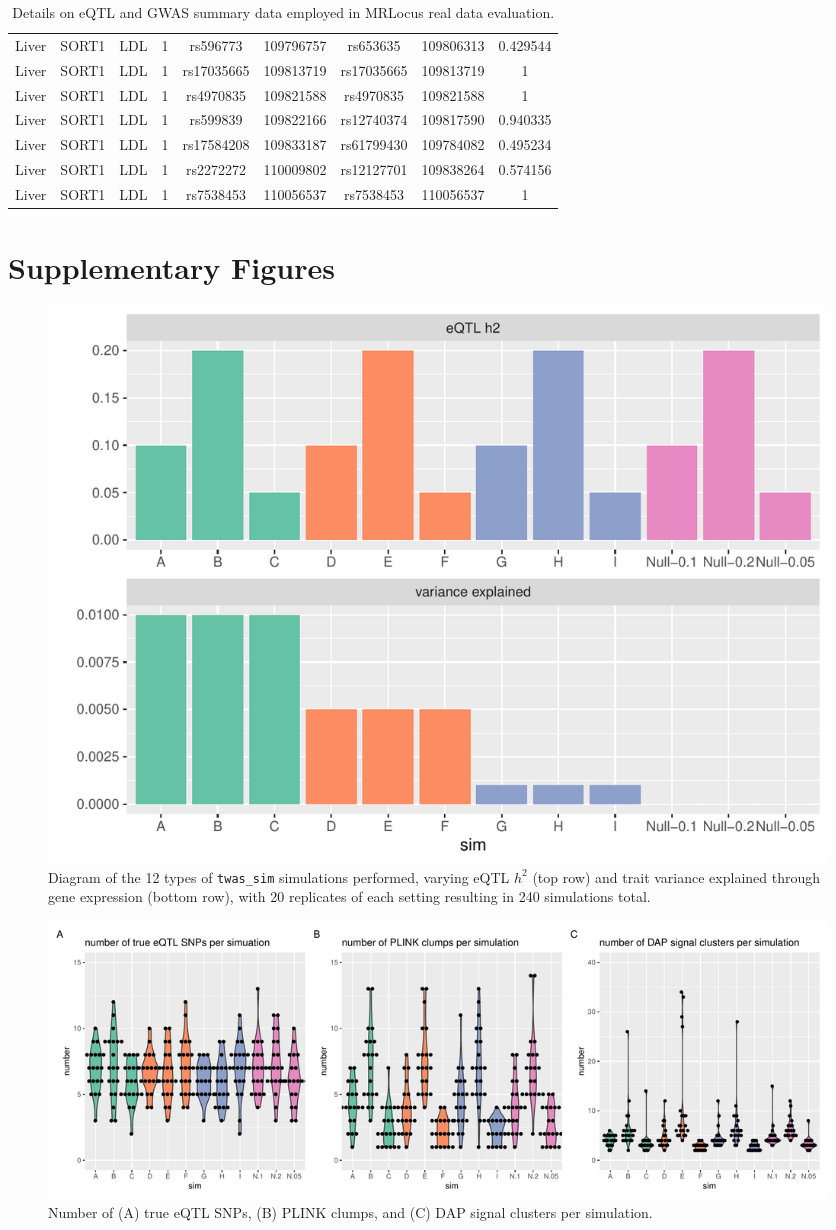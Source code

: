 \documentclass[11pt]{article}
\begin{document}
\begin{table}[!ht]
\begin{tabular}{ccccccccc}
Liver & SORT1 & LDL & 1 & rs596773 & 109796757 & rs653635 & 109806313 & 0.429544 \\ 
Liver & SORT1 & LDL & 1 & rs17035665 & 109813719 & rs17035665 & 109813719 & 1 \\ 
Liver & SORT1 & LDL & 1 & rs4970835 & 109821588 & rs4970835 & 109821588 & 1 \\ 
Liver & SORT1 & LDL & 1 & rs599839 & 109822166 & rs12740374 & 109817590 & 0.940335 \\ 
Liver & SORT1 & LDL & 1 & rs17584208 & 109833187 & rs61799430 & 109784082 & 0.495234 \\ 
Liver & SORT1 & LDL & 1 & rs2272272 & 110009802 & rs12127701 & 109838264 & 0.574156 \\ 
Liver & SORT1 & LDL & 1 & rs7538453 & 110056537 & rs7538453 & 110056537 & 1 \\
\end{tabular}
\caption{Details on eQTL and GWAS summary data employed in MRLocus
  real data evaluation.}
\end{table}

\clearpage

\section*{Supplementary Figures}

\begin{figure}[!ht]
  \centering
  \includegraphics[width=.7\textwidth]{figs/sim_types}
  \caption{Diagram of the 12 types of \texttt{twas\_sim} simulations
    performed, varying eQTL $h^2$ (top row) and trait variance explained
    through gene expression (bottom row), with 20 replicates of each
    setting resulting in 240 simulations total.}
\end{figure}

\begin{figure}[!ht]
  \centering
  \includegraphics[width=\textwidth]{figs/sim_details}
  \caption{Number of (A) true eQTL SNPs, (B) PLINK clumps, and (C) DAP
    signal clusters per simulation.}
\end{figure}
\end{document}
